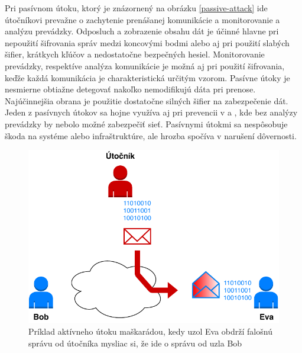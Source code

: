 Pri pasívnom útoku, ktorý je znázornený na obrázku \ref{passive-attack} ide útočníkovi prevažne o zachytenie prenášanej komunikácie a monitorovanie a  analýzu prevádzky. Odposluch a zobrazenie obsahu dát je účinné hlavne pri nepoužití šifrovania správ medzi koncovými bodmi alebo aj pri použití slabých šifier, krátkych kľúčov a nedostatočne bezpečných hesiel. Monitorovanie prevádzky, respektíve analýza komunikácie je možná aj pri použití šifrovania, keďže každá komunikácia je charakteristická určitým vzorom. Pasívne útoky je nesmierne obtiažne detegovať nakoľko nemodifikujú dáta pri prenose. Najúčinnejšia obrana je použitie dostatočne silných šifier na zabezpečenie dát. Jeden z pasívnych útokov sa hojne využíva aj pri prevencii v  a , kde bez analýzy prevádzky by nebolo možné zabezpečiť sieť. Pasívnymi útokmi sa nespôsobuje škoda na systéme alebo infraštruktúre, ale hrozba spočíva v narušení dôvernosti.

\begin{figure}[H]
	\begin{center}
		\includegraphics[scale=0.55]{obrazky/active-attack-masq.pdf}
	\end{center}
	\caption[Aktívny útok maškaráda]{Príklad aktívneho útoku maškarádou, kedy uzol Eva obdrží falošnú správu od útočníka mysliac si, že ide o správu od uzla Bob \cite{Stallings2011}}
	\label{active-attack-masq}
\end{figure}

